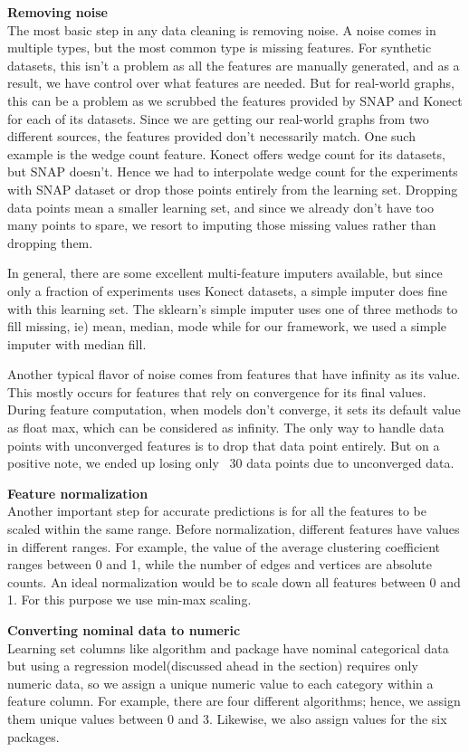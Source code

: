 \textbf{Removing noise}\\
The most basic step in any data cleaning is removing noise. A noise comes in multiple types, but the most common type is missing features. For synthetic datasets, this isn't a problem as all the features are manually generated, and as a result, we have control over what features are needed. But for real-world graphs, this can be a problem as we scrubbed the features provided by SNAP and Konect for each of its datasets. Since we are getting our real-world graphs from two different sources, the features provided don't necessarily match. One such example is the wedge count feature. Konect offers wedge count for its datasets, but SNAP doesn't. Hence we had to interpolate wedge count for the experiments with SNAP dataset or drop those points entirely from the learning set. Dropping data points mean a smaller learning set, and since we already don't have too many points to spare, we resort to imputing those missing values rather than dropping them. 

In general, there are some excellent multi-feature imputers available, but since only a fraction of experiments uses Konect datasets, a simple imputer does fine with this learning set. The sklearn's simple imputer uses one of three methods to fill missing, ie) mean, median, mode while for our framework, we used a simple imputer with median fill. 

Another typical flavor of noise comes from features that have infinity as its value. This mostly occurs for features that rely on convergence for its final values. During feature computation, when models don't converge, it sets its default value as float max, which can be considered as infinity. The only way to handle data points with unconverged features is to drop that data point entirely. But on a positive note, we ended up losing only ~30 data points due to unconverged data.

\textbf{Feature normalization}\\
Another important step for accurate predictions is for all the features to be scaled within the same range. Before normalization, different features have values in different ranges. For example, the value of the average clustering coefficient ranges between 0 and 1, while the number of edges and vertices are absolute counts. An ideal normalization would be to scale down all features between 0 and 1. For this purpose we use min-max scaling.

\textbf{Converting nominal data to numeric}\\
Learning set columns like algorithm and package have nominal categorical data but using a regression model(discussed ahead in the section) requires only numeric data, so we assign a unique numeric value to each category within a feature column. For example, there are four different algorithms; hence, we assign them unique values between 0 and 3. Likewise, we also assign values for the six packages.

